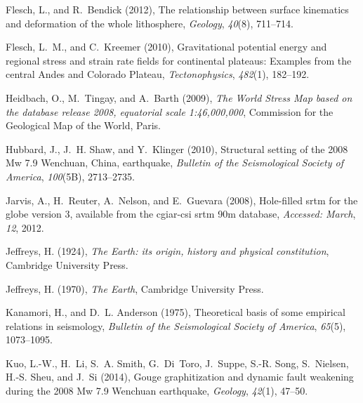 \documentclass[draft,jgrga]{AGUTeX}
\begin{document}
\begin{article}
\begin{thebibliography}{90}
Flesch, L., and R.~Bendick (2012), The relationship between surface kinematics
  and deformation of the whole lithosphere, \textit{Geology}, \textit{40}(8),
  711--714.

Flesch, L.~M., and C.~Kreemer (2010), Gravitational potential energy and
  regional stress and strain rate fields for continental plateaus: {E}xamples
  from the central {A}ndes and {C}olorado {P}lateau, \textit{Tectonophysics},
  \textit{482}(1), 182--192.

Heidbach, O., M.~Tingay, and A.~Barth (2009), \textit{The World Stress Map
  based on the database release 2008, equatorial scale 1:46,000,000},
  Commission for the Geological Map of the World, Paris.

Hubbard, J., J.~H. Shaw, and Y.~Klinger (2010), Structural setting of the 2008
  {M}w 7.9 {W}enchuan, {C}hina, earthquake, \textit{Bulletin of the
  Seismological Society of America}, \textit{100}(5B), 2713--2735.

Jarvis, A., H.~Reuter, A.~Nelson, and E.~Guevara (2008), Hole-filled srtm for
  the globe version 3, available from the cgiar-csi srtm 90m database,
  \textit{Accessed: March}, \textit{12}, 2012.

Jeffreys, H. (1924), \textit{The Earth: its origin, history and physical
  constitution}, Cambridge University Press.

Jeffreys, H. (1970), \textit{The Earth}, Cambridge University Press.

Kanamori, H., and D.~L. Anderson (1975), Theoretical basis of some empirical
  relations in seismology, \textit{Bulletin of the Seismological Society of
  America}, \textit{65}(5), 1073--1095.

Kuo, L.-W., H.~Li, S.~A. Smith, G.~Di~Toro, J.~Suppe, S.-R. Song, S.~Nielsen,
  H.-S. Sheu, and J.~Si (2014), Gouge graphitization and dynamic fault
  weakening during the 2008 {M}w 7.9 {W}enchuan earthquake, \textit{Geology},
  \textit{42}(1), 47--50.


\end{thebibliography}
\end{article}
\end{document}
